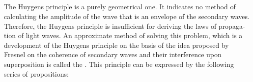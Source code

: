 \subsection{}\label{33.1.3} The Huygens principle is a purely geometrical one. It indicates no method of calculating the amplitude of the wave that is an envelope of the secondary waves. Therefore, the Huygens principle is insufficient for deriving the laws of propaga-tion of light waves. An approximate method of solving this problem, which is a development of the Huygens principle on the basis of the idea proposed by Fresnel on the coherence of secondary waves and their interference upon superposition is called the . This principle can be
expressed by the following series of propositions:

